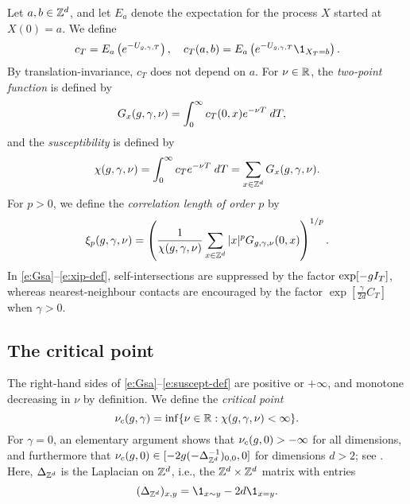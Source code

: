 Let $a,b \in { {{\mathbb Z}}^d }$, and
let $E_a$ denote the expectation for the
process $X$ started at $X(0)=a$.
We define
\begin{equation}
\label{e:c}
    c_T = E_a\left(e^{-U_{\gcc,\gamma,T}}\right),
    \quad
    c_T(a,b) = E_a\left(e^{-U_{\gcc,\gamma,T}}\1_{X_T = b}\right).
\end{equation}
By translation-invariance, $c_T$ does not depend on $a$.
For $\nu \in {\mathbb R}$, the \emph{two-point function} is defined by
\begin{align}
\lbeq{Gsa}
    G_x(\gcc,\gamma,\nu) &=
    \int_0^\infty c_T(0, x) e^{-\nu T} \; dT,
\end{align}
and the \emph{susceptibility} is defined by
\begin{equation}
\label{e:suscept-def}
    \chi(g, \gamma, \nu)
    = \int_0^\infty c_T e^{-\nu T} \; dT
    = \sum_{x\in{ {{\mathbb Z}}^d }} G_x(g,\gamma,\nu)
    .
\end{equation}
For $p>0$, we define the \emph{correlation length of order $p$} by
\begin{equation}
\lbeq{xip-def}
    \xi_p(\gcc,\gamma,\nu) = \left(\frac{1}{\chi(\gcc, \gamma, \nu)}
    \sum_{x\in\Zd} |x|^p G_{\gcc,\gamma,\nu}(0, x)
    \right)^{1/p}.
\end{equation}
In \eqref{e:Gsa}--\eqref{e:xip-def},
self-intersections are suppressed by the factor
$\exp[-g I_T]$, whereas nearest-neighbour
contacts are encouraged by the factor
$\exp[\frac{\gamma}{2d}C_T]$ when $\gamma > 0$.


\subsection{The critical point}

The right-hand sides of \eqref{e:Gsa}--\eqref{e:suscept-def} %
are positive or $+\infty$,
and %
monotone decreasing in $\nu$ by definition.
We define the \emph{critical point}
\begin{equation}
\label{e:nuc-def}
\nu_c(g, \gamma) = \inf \{ \nu \in {\mathbb R} : \chi(g, \gamma, \nu) < \infty \} .
\end{equation}
For $\gamma=0$, an elementary argument
shows that $\nu_c(g,0) > -\infty$ for all dimensions, and furthermore
that $\nu_c(g, 0) \in [ -2  g(-\Delta_{{ {{\mathbb Z}}^d }}^{-1})_{0,0}, 0]$ for dimensions $d>2$;
see \cite[Lemma~\ref{log-lem:csub}]{BBS-saw4-log}.
Here, $\Delta_{{ {{\mathbb Z}}^d }}$ is the Laplacian on ${ {{\mathbb Z}}^d }$, i.e., the ${ {{\mathbb Z}}^d } \times { {{\mathbb Z}}^d }$
matrix with entries
\begin{equation}
\label{e:Deltaxy}
(\Delta_{\Zd})_{x, y} = \1_{x\sim y} - 2 d \1_{x=y}.
\end{equation}

